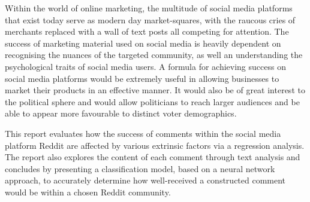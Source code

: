 \beforeabstract
{}
Within the world of online marketing, the multitude of social media platforms that exist today serve as modern day market-squares, with the raucous cries of merchants replaced with a wall of text posts all competing for attention. The success of marketing material used on social media is heavily dependent on recognising the nuances of the targeted community, as well an understanding the psychological traits of social media users. A formula for achieving success on social media platforms would be extremely useful in allowing businesses to market their products in an effective manner. It would also be of great interest to the political sphere and would allow politicians to reach larger audiences and be able to appear more favourable to distinct voter demographics.

This report evaluates how the success of comments within the social media platform Reddit are affected by various extrinsic factors via a regression analysis.  The report also explores the content of each comment through text analysis and concludes by presenting a classification model, based on a neural network approach, to accurately determine how well-received a constructed comment would be within a chosen Reddit community.


\afterpreface \afterabstract

